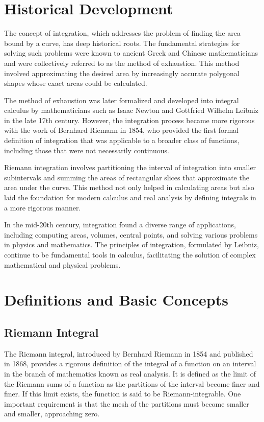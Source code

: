 \documentclass[12pt]{article}
\begin{document}
\section{Historical Development}
The concept of integration, which addresses the problem of finding the area bound by a curve, has deep historical roots. The fundamental strategies for solving such problems were known to ancient Greek and Chinese mathematicians and were collectively referred to as the method of exhaustion. This method involved approximating the desired area by increasingly accurate polygonal shapes whose exact areas could be calculated.

The method of exhaustion was later formalized and developed into integral calculus by mathematicians such as Isaac Newton and Gottfried Wilhelm Leibniz in the late 17th century. However, the integration process became more rigorous with the work of Bernhard Riemann in 1854, who provided the first formal definition of integration that was applicable to a broader class of functions, including those that were not necessarily continuous.

Riemann integration involves partitioning the interval of integration into smaller subintervals and summing the areas of rectangular slices that approximate the area under the curve. This method not only helped in calculating areas but also laid the foundation for modern calculus and real analysis by defining integrals in a more rigorous manner.

In the mid-20th century, integration found a diverse range of applications, including computing areas, volumes, central points, and solving various problems in physics and mathematics. The principles of integration, formulated by Leibniz, continue to be fundamental tools in calculus, facilitating the solution of complex mathematical and physical problems.

\section{Definitions and Basic Concepts}
\subsection{Riemann Integral}
The Riemann integral, introduced by Bernhard Riemann in 1854 and published in 1868, provides a rigorous definition of the integral of a function on an interval in the branch of mathematics known as real analysis. It is defined as the limit of the Riemann sums of a function as the partitions of the interval become finer and finer. If this limit exists, the function is said to be Riemann-integrable. One important requirement is that the mesh of the partitions must become smaller and smaller, approaching zero.
\end{document}

